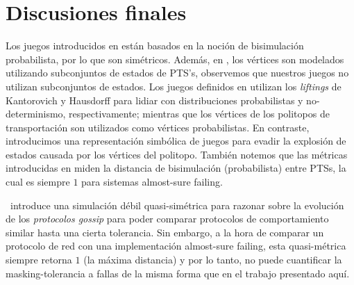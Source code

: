 \section{Discusiones finales} 
\label{sec:final_discussions_prob}

Los juegos introducidos en \cite{Bacci0LM17,BacciBLMTB19,DesharnaisGJP04,DesharnaisLT11}  están basados en la noción de bisimulación probabilista, por lo que son simétricos. Además, en \cite{DesharnaisGJP04,DesharnaisLT11}, los vértices son modelados utilizando subconjuntos de estados de PTS's, 
observemos que nuestros juegos no utilizan subconjuntos de estados. Los juegos definidos en  \cite{Bacci0LM17,BacciBLMTB19} utilizan los \textit{liftings} de Kantorovich y Hausdorff para lidiar con distribuciones probabilistas y no-determinismo, respectivamente; mientras que los vértices de los politopos de transportación son utilizados como vértices probabilistas. En contraste, introducimos una representación simbólica de juegos para evadir la explosión de estados causada por los vértices del politopo. También notemos que las métricas introducidas en \cite{Bacci0LM17,BacciBLMTB19} miden la distancia de bisimulación (probabilista) entre PTSs, la cual es siempre $1$ para sistemas almost-sure failing.
		
%
\cite{LanotteMT17}~introduce una simulación débil quasi-simétrica para razonar sobre la evolución de los \emph{ protocolos gossip} para poder comparar protocolos de comportamiento similar hasta una cierta tolerancia.
Sin embargo, a la hora de comparar un protocolo de red con una implementación almost-sure failing, esta quasi-métrica siempre retorna $1$ (la máxima distancia) y por lo tanto, no puede cuantificar la masking-tolerancia a fallas de la misma forma que en el trabajo presentado aquí.


